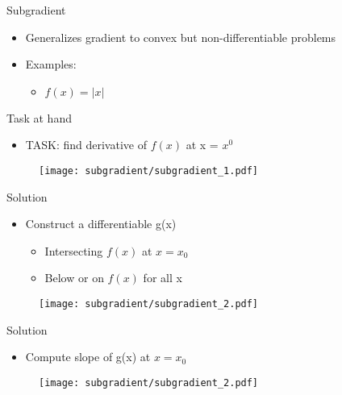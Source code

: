 \documentclass{beamer}
\begin{document}
\begin{frame}{Subgradient }
\begin{itemize}
	
	
	\item Generalizes gradient to convex but non-differentiable problems
	\item Examples:
	\begin{itemize}
		\item $f(x) = |x|$
	\end{itemize}
	
\end{itemize}
\end{frame}

\begin{frame}{Task at hand}
\begin{itemize}

\item TASK: find derivative of $f(x)$ at x = $x^0$
\end{itemize}
\begin{figure}
\centering
\texttt{[image: subgradient/subgradient\_1.pdf]}

\label{fig:Non-differentiable function}
\end{figure}


\end{frame}

\begin{frame}{Solution}

\begin{itemize}
\item Construct a differentiable g(x) 
\begin{itemize}
\item Intersecting $f(x)$ at $x = x_0$
\item Below or on $f(x)$ for all x
\end{itemize}
\end{itemize}
\begin{figure}
\centering
\texttt{[image: subgradient/subgradient\_2.pdf]}
\label{fig:my_label}
\end{figure}
\end{frame}

\begin{frame}{Solution}

\begin{itemize}
\item Compute slope of g(x) at $x = x_0$
\end{itemize}
\begin{figure}
\centering
\texttt{[image: subgradient/subgradient\_2.pdf]}

\label{fig:my_label}
\end{figure}
\end{frame}
\end{document}
